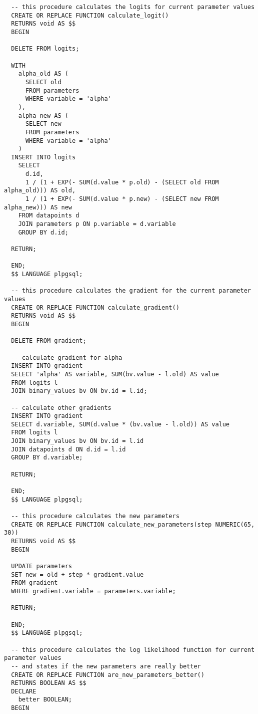 \begin{verbatim}
  -- this procedure calculates the logits for current parameter values
  CREATE OR REPLACE FUNCTION calculate_logit()
  RETURNS void AS $$
  BEGIN

  DELETE FROM logits;

  WITH
    alpha_old AS (
      SELECT old
      FROM parameters
      WHERE variable = 'alpha'
    ),
    alpha_new AS (
      SELECT new
      FROM parameters
      WHERE variable = 'alpha'
    )
  INSERT INTO logits
    SELECT
      d.id,
      1 / (1 + EXP(- SUM(d.value * p.old) - (SELECT old FROM alpha_old))) AS old,
      1 / (1 + EXP(- SUM(d.value * p.new) - (SELECT new FROM alpha_new))) AS new
    FROM datapoints d
    JOIN parameters p ON p.variable = d.variable
    GROUP BY d.id;

  RETURN;

  END;
  $$ LANGUAGE plpgsql;

  -- this procedure calculates the gradient for the current parameter values
  CREATE OR REPLACE FUNCTION calculate_gradient()
  RETURNS void AS $$
  BEGIN

  DELETE FROM gradient;

  -- calculate gradient for alpha
  INSERT INTO gradient
  SELECT 'alpha' AS variable, SUM(bv.value - l.old) AS value
  FROM logits l
  JOIN binary_values bv ON bv.id = l.id;

  -- calculate other gradients
  INSERT INTO gradient
  SELECT d.variable, SUM(d.value * (bv.value - l.old)) AS value
  FROM logits l
  JOIN binary_values bv ON bv.id = l.id
  JOIN datapoints d ON d.id = l.id
  GROUP BY d.variable;

  RETURN;

  END;
  $$ LANGUAGE plpgsql;

  -- this procedure calculates the new parameters
  CREATE OR REPLACE FUNCTION calculate_new_parameters(step NUMERIC(65, 30))
  RETURNS void AS $$
  BEGIN

  UPDATE parameters
  SET new = old + step * gradient.value
  FROM gradient
  WHERE gradient.variable = parameters.variable;

  RETURN;

  END;
  $$ LANGUAGE plpgsql;

  -- this procedure calculates the log likelihood function for current parameter values
  -- and states if the new parameters are really better
  CREATE OR REPLACE FUNCTION are_new_parameters_better()
  RETURNS BOOLEAN AS $$
  DECLARE
    better BOOLEAN;
  BEGIN


\end{verbatim}
